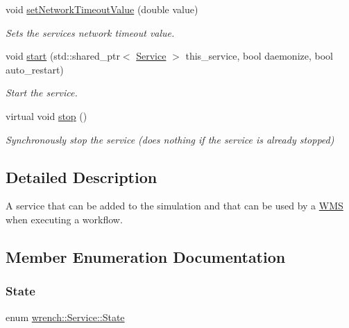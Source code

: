 \begin{DoxyCompactItemize}
void \hyperlink{classwrench_1_1_service_a2bdf99201280d83b44a03c0b78ebdf90}{set\+Network\+Timeout\+Value} (double value)
\begin{DoxyCompactList}\small\item\em Sets the service\textquotesingle{}s network timeout value. \end{DoxyCompactList}\item 
void \hyperlink{classwrench_1_1_service_a77f35bdb636f0b6f819ae28135081ce8}{start} (std\+::shared\+\_\+ptr$<$ \hyperlink{classwrench_1_1_service}{Service} $>$ this\+\_\+service, bool daemonize, bool auto\+\_\+restart)
\begin{DoxyCompactList}\small\item\em Start the service. \end{DoxyCompactList}\item 
virtual void \hyperlink{classwrench_1_1_service_ac33a32f4758c6f51b27d2cfb9b46efda}{stop} ()
\begin{DoxyCompactList}\small\item\em Synchronously stop the service (does nothing if the service is already stopped) \end{DoxyCompactList}\end{DoxyCompactItemize}


\subsection{Detailed Description}
A service that can be added to the simulation and that can be used by a \hyperlink{classwrench_1_1_w_m_s}{W\+MS} when executing a workflow. 

\subsection{Member Enumeration Documentation}
\mbox{\label{classwrench_1_1_service_a6f4e098718aa5d6f637c694de779e5c7}} 
\subsubsection{\texorpdfstring{State}{State}}
{\footnotesize\ttfamily enum \hyperlink{classwrench_1_1_service_a6f4e098718aa5d6f637c694de779e5c7}{wrench\+::\+Service\+::\+State}}



